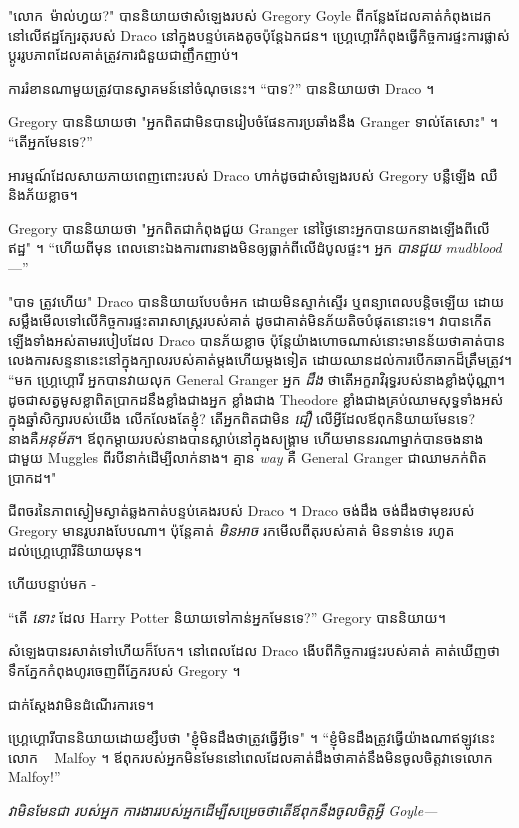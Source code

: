 {{{{{"លោក~ម៉ាល់ហ្វយ?" បាននិយាយថាសំឡេងរបស់ Gregory Goyle ពីកន្លែងដែលគាត់កំពុងដេកនៅលើឥដ្ឋក្បែរតុរបស់ Draco នៅក្នុងបន្ទប់គេងតូចប៉ុន្តែឯកជន។ ហ្គ្រេហ្គោរី​កំពុង​ធ្វើ​កិច្ចការ​ផ្ទះ​ការ​ផ្លាស់​ប្តូរ​រូប​ភាព​ដែល​គាត់​ត្រូវ​ការ​ជំនួយ​ជា​ញឹក​ញាប់។

ការរំខានណាមួយត្រូវបានស្វាគមន៍នៅចំណុចនេះ។ “បាទ?” បាននិយាយថា Draco ។

Gregory បាននិយាយថា "អ្នកពិតជាមិនបានរៀបចំផែនការប្រឆាំងនឹង Granger ទាល់តែសោះ" ។ “តើអ្នកមែនទេ?”

អារម្មណ៍ដែលសាយភាយពេញពោះរបស់ Draco ហាក់ដូចជាសំឡេងរបស់ Gregory បន្លឺឡើង ឈឺ និងភ័យខ្លាច។

Gregory បាននិយាយថា "អ្នកពិតជាកំពុងជួយ Granger នៅថ្ងៃនោះអ្នកបានយកនាងឡើងពីលើឥដ្ឋ" ។ “ហើយពីមុន ពេលនោះឯងការពារនាងមិនឲ្យធ្លាក់ពីលើដំបូលផ្ទះ។ អ្នក \emph{បានជួយ} \emph{mudblood}—”

"បាទ ត្រូវហើយ" Draco បាននិយាយបែបចំអក ដោយមិនស្ទាក់ស្ទើរ ឬពន្យាពេលបន្តិចឡើយ ដោយសម្លឹងមើលទៅលើកិច្ចការផ្ទះតារាសាស្ត្ររបស់គាត់ ដូចជាគាត់មិនភ័យតិចបំផុតនោះទេ។ វាបានកើតឡើងទាំងអស់តាមរបៀបដែល Draco បានភ័យខ្លាច ប៉ុន្តែយ៉ាងហោចណាស់នោះមានន័យថាគាត់បានលេងការសន្ទនានេះនៅក្នុងក្បាលរបស់គាត់ម្តងហើយម្តងទៀត ដោយឈានដល់ការបើកឆាកដ៏ត្រឹមត្រូវ។ “មក ហ្គ្រេហ្គោរី អ្នកបានវាយលុក General Granger អ្នក \emph{ដឹង} ថាតើអក្ខរាវិរុទ្ធរបស់នាងខ្លាំងប៉ុណ្ណា។ ដូចជាសត្វមូសខ្លាពិតប្រាកដនឹងខ្លាំងជាងអ្នក ខ្លាំងជាង Theodore ខ្លាំងជាងគ្រប់ឈាមសុទ្ធទាំងអស់ក្នុងឆ្នាំសិក្សារបស់យើង លើកលែងតែខ្ញុំ? តើអ្នកពិតជាមិន \emph{ជឿ} លើអ្វីដែលឪពុកនិយាយមែនទេ? នាងគឺ\emph{អនុម័ត}។ ឪពុកម្តាយរបស់នាងបានស្លាប់នៅក្នុងសង្រ្គាម ហើយមាននរណាម្នាក់បានចងនាងជាមួយ Muggles ពីរបីនាក់ដើម្បីលាក់នាង។ គ្មាន \emph{way} គឺ General Granger ជាឈាមភក់ពិតប្រាកដ។"

ជីពចរនៃភាពស្ងៀមស្ងាត់ឆ្លងកាត់បន្ទប់គេងរបស់ Draco ។ Draco ចង់ដឹង ចង់ដឹងថាមុខរបស់ Gregory មានរូបរាងបែបណា។ ប៉ុន្តែគាត់ \emph{មិនអាច} រកមើលពីតុរបស់គាត់ មិនទាន់ទេ រហូតដល់ហ្គ្រេហ្គោរីនិយាយមុន។

ហើយបន្ទាប់មក -

“តើ \emph{នោះ} ដែល Harry Potter និយាយទៅកាន់អ្នកមែនទេ?” Gregory បាននិយាយ។

សំឡេង​បាន​រសាត់​ទៅ​ហើយ​ក៏​បែក។ នៅពេលដែល Draco ងើបពីកិច្ចការផ្ទះរបស់គាត់ គាត់ឃើញថាទឹកភ្នែកកំពុងហូរចេញពីភ្នែករបស់ Gregory ។

ជាក់ស្តែងវាមិនដំណើរការទេ។

ហ្គ្រេហ្គោរីបាននិយាយដោយខ្សឹបថា "ខ្ញុំមិនដឹងថាត្រូវធ្វើអ្វីទេ" ។ “ខ្ញុំ​មិន​ដឹង​ត្រូវ​ធ្វើ​យ៉ាង​ណា​ឥឡូវ​នេះ​លោក ~ Malfoy ។ ឪពុក​របស់​អ្នក​មិន​មែន​នៅ​ពេល​ដែល​គាត់​ដឹង​ថា​គាត់​នឹង​មិន​ចូល​ចិត្ត​វា​ទេ​លោក ~ Malfoy!”

\emph{វាមិនមែនជា \emph{របស់អ្នក} ការងាររបស់អ្នកដើម្បីសម្រេចថាតើឪពុកនឹងចូលចិត្តអ្វី Goyle—}

}}}}}
